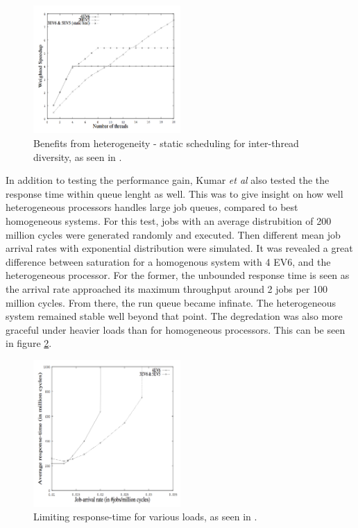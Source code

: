 \begin{figure}[htb]
    \centering
    \includegraphics[width=0.5\textwidth]{Figures/Heterogeneous/Kumar2}
    \caption{Benefits from heterogeneity - static scheduling for inter-thread diversity, as seen in \cite{heterogeneous-perf}.}
    \label{fig:Kumar2}
\end{figure}

In addition to testing the performance gain, Kumar \textit{et al} also tested the the response time within queue lenght as well.
This was to give insight on how well heterogeneous processors handles large job queues, compared to best homogeneous systems.
For this test, jobs with an average distrubition of 200 million cycles were generated randomly and executed.
Then different mean job arrival rates with exponential distribution were simulated.
It was revealed a great difference between saturation for a homogenous system with 4 EV6, and the heterogeneous processor.
For the former, the unbounded response time is seen as the arrival rate approached its maximum throughput around 2 jobs per 100 million cycles.
From there, the run queue became infinate.
The heterogeneous system remained stable well beyond that point.
The degredation was also more graceful under heavier loads than for homogeneous processors.
This can be seen in figure \ref{fig:Kumar3}.

\begin{figure}[htb]
    \centering
    \includegraphics[width=0.5\textwidth]{Figures/Heterogeneous/Kumar3}
    \caption{Limiting response-time for various loads, as seen in \cite{heterogeneous-perf}.}
    \label{fig:Kumar3}
\end{figure}


